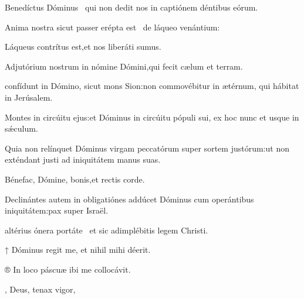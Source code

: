 \begin{multicols}{2}
Benedíctus Dóminus \GreStar\ qui non dedit nos in captiónem déntibus eórum.

Anima nostra sicut passer erépta est \GreStar\ de láqueo venántium\thinspace:

Láqueus contrítus est,\GreStarNbsp et nos liberáti sumus.

Adjutórium nostrum in nómine Dómini,\GreStarNbsp qui fecit cælum et terram.


\vspace{-0.3cm}


\vspace{-0.1cm}

\Normal

 confídunt in Dómino, sicut mons Sion\thinspace:\GreStarNbsp non commovébitur in ætérnum, qui hábitat in Jerúsalem.

Montes in circúitu ejus\thinspace:\GreStarNbsp et Dóminus in circúitu pópuli sui, ex hoc nunc et usque in sǽculum.

Quia non relínquet Dóminus virgam peccatórum super sortem justórum\thinspace:\GreStarNbsp ut non exténdant justi ad iniquitátem manus suas.

Bénefac, Dómine, bonis,\GreStarNbsp et rectis corde.

Declinántes autem in obligatiónes addúcet Dóminus cum operántibus iniquitátem\thinspace:\GreStarNbsp pax super Israël.



 altérius ónera portáte \GreStar\ et sic adimplébitis legem Christi.

\vspace{0.3cm}

↑ Dóminus regit me, et nihil mihi déerit.

® In loco páscuæ ibi me collocávit.



\Ligne



\vspace{0.2cm}

\Hymne{}

\setlength{\leftskip}{0cm}
, Deus, tenax vigor,


\end{multicols}
